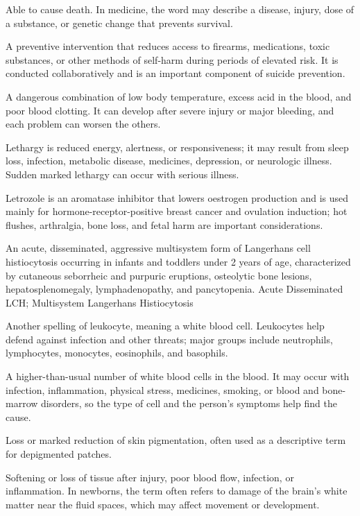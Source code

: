  Able to cause death. In medicine, the word may describe a disease, injury, dose of a substance, or genetic change that prevents survival.

 A preventive intervention that reduces access to firearms, medications, toxic
substances, or other methods of self-harm during periods of elevated risk. It is
conducted collaboratively and is an important component of suicide prevention.

 A dangerous combination of low body temperature, excess acid in the blood, and poor blood clotting. It can develop after severe injury or major bleeding, and each problem can worsen the others.

 Lethargy is reduced energy, alertness, or responsiveness; it may result from sleep loss, infection, metabolic disease, medicines, depression, or neurologic illness. Sudden marked lethargy can occur with serious illness.

 Letrozole is an aromatase inhibitor that lowers oestrogen production and is used mainly for hormone-receptor-positive breast cancer and ovulation induction; hot flushes, arthralgia, bone loss, and fetal harm are important considerations.

 An acute, disseminated, aggressive multisystem form of Langerhans cell histiocytosis occurring in infants and toddlers under 2 years of age, characterized by cutaneous seborrheic and purpuric eruptions, osteolytic bone lesions, hepatosplenomegaly, lymphadenopathy, and pancytopenia.
\synonyms
Acute Disseminated LCH; Multisystem Langerhans Histiocytosis

 Another spelling of leukocyte, meaning a white blood cell. Leukocytes help defend against infection and other threats; major groups include neutrophils, lymphocytes, monocytes, eosinophils, and basophils.

 A higher-than-usual number of white blood cells in the blood. It may occur with infection, inflammation, physical stress, medicines, smoking, or blood and bone-marrow disorders, so the type of cell and the person's symptoms help find the cause.

 Loss or marked reduction of skin pigmentation, often used as a descriptive term for depigmented patches.

 Softening or loss of tissue after injury, poor blood flow, infection, or inflammation. In newborns, the term often refers to damage of the brain’s white matter near the fluid spaces, which may affect movement or development.

